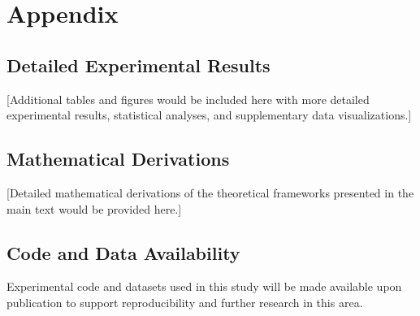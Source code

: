 \documentclass{article}
\begin{document}



\appendix

\section{Appendix}

\subsection{Detailed Experimental Results}

[Additional tables and figures would be included here with more detailed experimental results, statistical analyses, and supplementary data visualizations.]

\subsection{Mathematical Derivations}

[Detailed mathematical derivations of the theoretical frameworks presented in the main text would be provided here.]

\subsection{Code and Data Availability}

Experimental code and datasets used in this study will be made available upon publication to support reproducibility and further research in this area.
\end{document}
